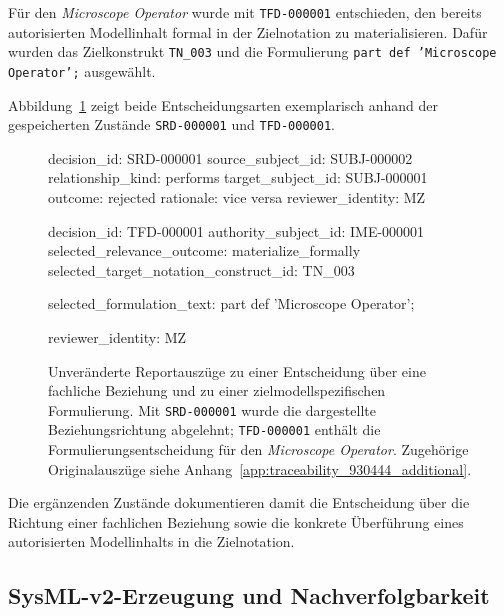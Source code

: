 Für den \emph{Microscope Operator} wurde mit \texttt{TFD-000001}
entschieden, den bereits autorisierten Modellinhalt formal in der
Zielnotation zu materialisieren. Dafür wurden das Zielkonstrukt
\texttt{TN\_003} und die Formulierung
\texttt{part def 'Microscope Operator';} ausgewählt.

Abbildung~\ref{fig:result_930444_additional_authority} zeigt beide
Entscheidungsarten exemplarisch anhand der gespeicherten Zustände
\texttt{SRD-000001} und \texttt{TFD-000001}.

\begin{figure}[htbp]
    \centering
    \begin{minipage}{0.94\textwidth}
        \begin{evidencebox}
decision_id:       SRD-000001
source_subject_id: SUBJ-000002
relationship_kind: performs
target_subject_id: SUBJ-000001
outcome:           rejected
rationale:         vice versa
reviewer_identity: MZ
        \end{evidencebox}

        \begin{evidencebox}
decision_id:                       TFD-000001
authority_subject_id:              IME-000001
selected_relevance_outcome:        materialize_formally
selected_target_notation_construct_id: TN_003

selected_formulation_text:
  part def 'Microscope Operator';

reviewer_identity:
  MZ
        \end{evidencebox}
    \end{minipage}
    \caption[Ergänzende menschliche Entscheidungszustände]{
    Unveränderte Reportauszüge zu einer Entscheidung über eine fachliche
    Beziehung und zu einer zielmodellspezifischen Formulierung. Mit
    \texttt{SRD-000001} wurde die dargestellte Beziehungsrichtung abgelehnt;
    \texttt{TFD-000001} enthält die Formulierungsentscheidung für den
    \emph{Microscope Operator}. Zugehörige Originalauszüge siehe
    Anhang~\ref{app:traceability_930444_additional}.}
    \label{fig:result_930444_additional_authority}
\end{figure}

Die ergänzenden Zustände dokumentieren damit die Entscheidung über die
Richtung einer fachlichen Beziehung sowie die konkrete Überführung eines
autorisierten Modellinhalts in die Zielnotation.

\subsection{SysML-v2-Erzeugung und Nachverfolgbarkeit}
\label{sec:results_traceability_sysml}

